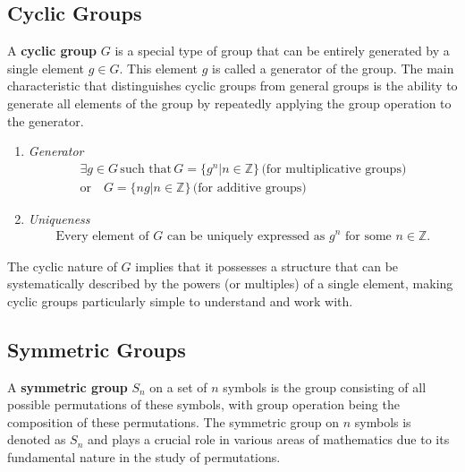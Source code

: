 \documentclass{article}
\begin{document}
\subsection{Cyclic Groups}

A \textbf{cyclic group} $G$ is a special type of group that can be entirely generated by a single element $g \in G$. This element $g$ is called a generator of the group. The main characteristic that distinguishes cyclic groups from general groups is the ability to generate all elements of the group by repeatedly applying the group operation to the generator.

\begin{enumerate}
    \item \textit{Generator}
    \begin{align*}
        \exists g \in G \, \text{such that} \, G = \{g^n | n \in \mathbb{Z}\} \, \text{(for multiplicative groups)} \\
        \text{or} \quad G = \{ng | n \in \mathbb{Z}\} \, \text{(for additive groups)}
    \end{align*}
    
    \item \textit{Uniqueness}
    \begin{align*}
        \text{Every element of } G \text{ can be uniquely expressed as } g^n \text{ for some } n \in \mathbb{Z}.
    \end{align*}
\end{enumerate}

The cyclic nature of $G$ implies that it possesses a structure that can be systematically described by the powers (or multiples) of a single element, making cyclic groups particularly simple to understand and work with.

\newpage

\subsection{Symmetric Groups}

A \textbf{symmetric group} $S_n$ on a set of $n$ symbols is the group consisting of all possible permutations of these symbols, with group operation being the composition of these permutations. The symmetric group on $n$ symbols is denoted as $S_n$ and plays a crucial role in various areas of mathematics due to its fundamental nature in the study of permutations.\\
\end{document}
